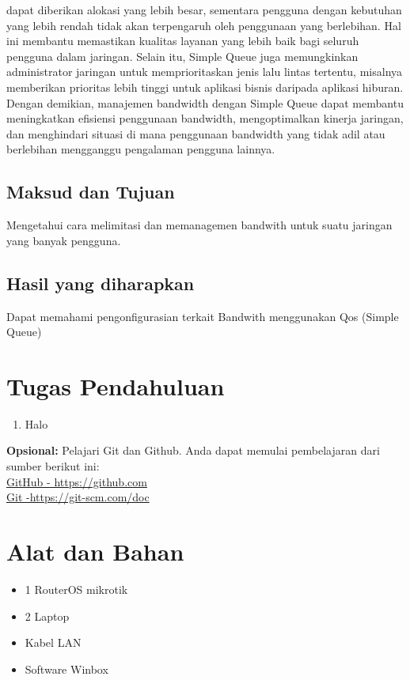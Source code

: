 dapat diberikan alokasi yang lebih besar, sementara pengguna dengan kebutuhan yang lebih rendah tidak akan terpengaruh oleh penggunaan yang berlebihan. Hal ini membantu
memastikan kualitas layanan yang lebih baik bagi seluruh pengguna dalam jaringan. Selain
itu, Simple Queue juga memungkinkan administrator jaringan untuk memprioritaskan jenis
lalu lintas tertentu, misalnya memberikan prioritas lebih tinggi untuk aplikasi bisnis daripada
aplikasi hiburan. Dengan demikian, manajemen bandwidth dengan Simple Queue dapat
membantu meningkatkan efisiensi penggunaan bandwidth, mengoptimalkan kinerja jaringan,
dan menghindari situasi di mana penggunaan bandwidth yang tidak adil atau berlebihan
mengganggu pengalaman pengguna lainnya.

\subsection{Maksud dan Tujuan}
Mengetahui cara melimitasi dan memanagemen bandwith untuk suatu jaringan yang banyak pengguna.

\subsection{Hasil yang diharapkan}
Dapat memahami pengonfigurasian terkait Bandwith menggunakan Qos (Simple Queue)

\section{Tugas Pendahuluan}
\begin{enumerate}
	\item Halo
\end{enumerate}

\begin{center}
	\colorbox{cyan!30}{\parbox{0.8\linewidth}{\textbf{Opsional:} Pelajari Git dan Github. Anda dapat memulai pembelajaran dari sumber berikut ini: \\ \href{https://github.com}{GitHub - https://github.com} \\ \href{https://git-scm.com/doc}{Git -https://git-scm.com/doc}}}
\end{center}

\section{Alat dan Bahan}
\begin{itemize}[label=$\bullet$, itemsep=-1pt, leftmargin=*]
	\item 1 RouterOS mikrotik
	\item 2 Laptop
	\item Kabel LAN
	\item Software Winbox
\end{itemize}

